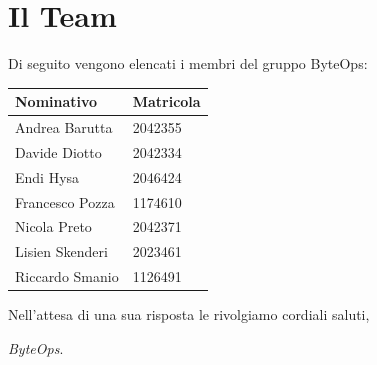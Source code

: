 \documentclass{article}
\begin{document}
\section{Il Team}
Di seguito vengono elencati i membri del gruppo ByteOps:
\vspace{1cm}

\begin{center}
    \begin{tabular}{|C{4cm}|C{2cm}|}
    \hline
        \textbf{Nominativo} & \textbf{Matricola} \\
        \hline\hline
        Andrea Barutta  & 2042355 \\
        \hline
        Davide Diotto   & 2042334 \\ 
        \hline
        Endi Hysa       & 2046424 \\ 
        \hline
        Francesco Pozza & 1174610 \\ 
        \hline
        Nicola Preto    & 2042371 \\ 
        \hline
        Lisien Skenderi & 2023461 \\ 
        \hline
        Riccardo Smanio & 1126491 \\ 
        \hline
    \end{tabular}
\end{center}


\vspace{1cm}
Nell'attesa di una sua risposta le rivolgiamo cordiali saluti,

\vspace{0.3cm}

\textit{ByteOps}.
\end{document}
